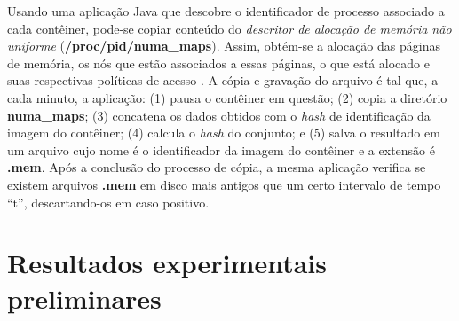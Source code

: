 Usando uma aplicação Java que descobre o identificador de processo associado a cada contêiner, pode-se copiar conteúdo do \textit{descritor de alocação de memória não uniforme} (\textbf{/proc/pid/numa\_maps}).
%
Assim, obtém-se a alocação das páginas de memória, os nós que estão associados a essas páginas, o que está alocado e suas respectivas políticas de acesso \cite{UnixManPagesNumaMaps}.
%
A cópia e gravação do arquivo é tal que, a cada minuto, a aplicação:
(1) pausa o contêiner em questão; 
(2) copia a diretório \textbf{numa\_maps}; 
(3)  concatena os dados obtidos com o \textit{hash} de identificação da imagem do contêiner;
(4) calcula o \textit{hash} do conjunto; e 
(5) salva o resultado em um arquivo cujo nome é o identificador da imagem do contêiner e a extensão é \textbf{.mem}. 
%
Após a conclusão do processo de cópia, a mesma aplicação verifica se existem arquivos \textbf{.mem} em disco mais antigos que um certo intervalo de tempo ``t'', descartando-os em caso positivo.
%


%

\section{Resultados experimentais preliminares}
\label{sec:proposta-exp}

